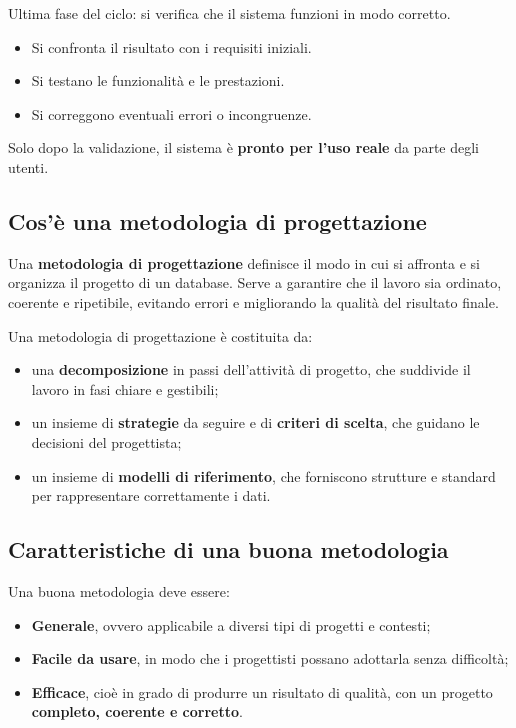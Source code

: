 \begin{tcolorbox}[colback=purple!10!white, colframe=purple!70!black, title=\textbf{8. Validazione e collaudo}]
Ultima fase del ciclo: si verifica che il sistema funzioni in modo corretto.  
\begin{itemize}
    \item Si confronta il risultato con i requisiti iniziali.  
    \item Si testano le funzionalità e le prestazioni.  
    \item Si correggono eventuali errori o incongruenze.
\end{itemize}
Solo dopo la validazione, il sistema è \textbf{pronto per l’uso reale} da parte degli utenti.
\end{tcolorbox}

\subsection{Cos'è una metodologia di progettazione}

Una \textbf{metodologia di progettazione} definisce il modo in cui si affronta e si organizza il progetto di un database.  
Serve a garantire che il lavoro sia ordinato, coerente e ripetibile, evitando errori e migliorando la qualità del risultato finale.

Una metodologia di progettazione è costituita da:
\begin{itemize}
    \item una \textbf{decomposizione} in passi dell’attività di progetto, che suddivide il lavoro in fasi chiare e gestibili;
    \item un insieme di \textbf{strategie} da seguire e di \textbf{criteri di scelta}, che guidano le decisioni del progettista;
    \item un insieme di \textbf{modelli di riferimento}, che forniscono strutture e standard per rappresentare correttamente i dati.
\end{itemize}

\subsection{Caratteristiche di una buona metodologia}

Una buona metodologia deve essere:
\begin{itemize}
    \item \textbf{Generale}, ovvero applicabile a diversi tipi di progetti e contesti;
    \item \textbf{Facile da usare}, in modo che i progettisti possano adottarla senza difficoltà;
    \item \textbf{Efficace}, cioè in grado di produrre un risultato di qualità, con un progetto \textbf{completo, coerente e corretto}.
\end{itemize}

